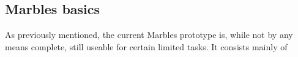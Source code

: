 \subsection{Marbles basics}

As previously mentioned, the current Marbles prototype is, while not by any
means complete, still useable for certain limited tasks. It consists mainly
of 

